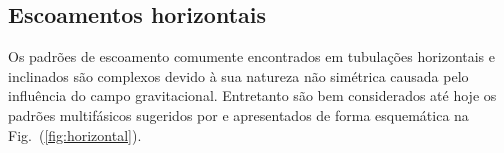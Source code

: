 \subsection{Escoamentos horizontais}

Os padrões de escoamento comumente encontrados em tubulações horizontais
e inclinados são complexos devido à sua natureza não simétrica causada
pelo influência do campo gravitacional. Entretanto são bem considerados
até hoje os padrões multifásicos sugeridos por \cite{alves1954} e
apresentados de forma esquemática na Fig.~(\ref{fig:horizontal}). 

\begin{figure}[h!]
	\begin{center}
		\\
		\\

\end{center}
\end{figure}
